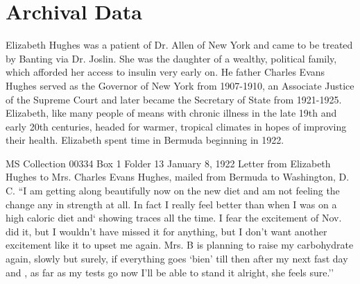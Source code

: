 \documentclass[12pt]{article}
\begin{document}
\begin{enumerate}


\end{enumerate}
\section{Archival Data}

Elizabeth Hughes was a patient of Dr. Allen of New York and came to be treated by Banting via Dr. Joslin. She was the daughter of a wealthy, political family, which afforded her access to insulin very early on. He father Charles Evans Hughes served as the Governor of New York from 1907-1910, an Associate Justice of the Supreme Court and later became the Secretary of State from 1921-1925. Elizabeth, like many people of means with chronic illness in the late 19th and early 20th centuries, headed for warmer, tropical climates in hopes of improving their health. Elizabeth spent time in Bermuda beginning in 1922.

MS Collection 00334
Box 1 Folder 13
January 8, 1922
Letter from Elizabeth Hughes to Mrs. Charles Evans Hughes, mailed from Bermuda to Washington, D. C. 
``I am getting along beautifully now on the new diet and am not feeling the change any in strength at all. In fact I really feel better than when I was on a high caloric diet and` showing traces all the time. I fear the excitement of Nov. did it, but I wouldn't have missed it for anything, but I don't want another excitement like it to upset me again. Mrs. B is planning to raise my carbohydrate again, slowly but surely, if everything goes `bien' till then after my next fast day and , as far as my tests go now I'll be able to stand it alright, she feels sure.''
\end{document}
